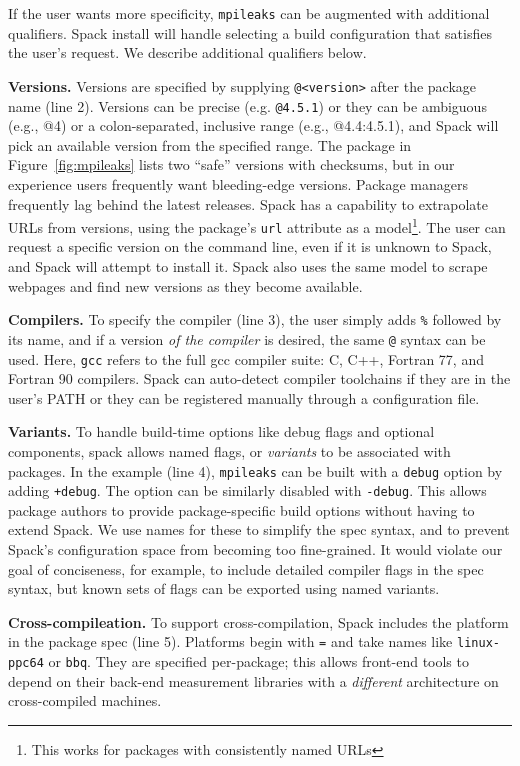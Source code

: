 If the user wants more specificity, {\tt mpileaks} can be augmented with additional
qualifiers.  Spack install will handle selecting a build configuration that satisfies
the user's request.  We describe additional qualifiers below.

{\bf Versions.}
Versions are specified by supplying {\tt @<version>} after the package name (line 2). 
Versions can be precise (e.g. {\tt @4.5.1}) or 
they can be ambiguous (e.g., @4) or a colon-separated, inclusive range (e.g., @4.4:4.5.1),
and Spack will pick an available version from the specified range.
The package in Figure~\ref{fig:mpileaks} lists two ``safe'' versions with checksums, but
in our experience users frequently want bleeding-edge versions.  Package managers
frequently lag behind the latest releases. 
Spack has a capability to extrapolate URLs from versions,
using the package's {\tt url} attribute as a model\footnote{This works
for packages with consistently named URLs}.  The user can request a specific
version on the command line, even if it is unknown to Spack,
and Spack will attempt to install it.  Spack also uses the same
model to scrape webpages and find new versions as they become available.

{\bf Compilers.}
To specify the compiler (line 3), the user
simply adds {\tt \%} followed by its name, and if a version {\it of the compiler} 
is desired, the same {\tt @} syntax can be used.  Here, {\tt gcc} refers to the full
gcc compiler suite: C, C++, Fortran 77, and Fortran 90 compilers.  Spack can auto-detect
compiler toolchains if they are in the user's PATH or they can be registered manually
through a configuration file.

{\bf Variants.}
To handle build-time options like debug flags and optional components, spack
allows named flags, or {\it variants} to be associated with packages.  
In the example (line 4), {\tt mpileaks} can be built with a {\tt debug} option by
adding {\tt +debug}.  The option can be similarly disabled with {\tt -debug}.  
This allows package authors to provide package-specific build options without 
having to extend Spack.  We use names for these to simplify the spec
syntax, and to prevent Spack's configuration space from becoming too fine-grained.
It would violate our goal of conciseness, for example, to include detailed 
compiler flags in the spec syntax, but known sets of flags can be exported using
named variants.

{\bf Cross-compileation.}
To support cross-compilation, Spack includes the platform in the package spec (line 5).
Platforms begin with {\tt =} and take names like {\tt linux-ppc64} or {\tt bbq}.  They are
specified per-package; this allows front-end tools to depend on their back-end measurement
libraries with a {\it different} architecture on cross-compiled machines.

